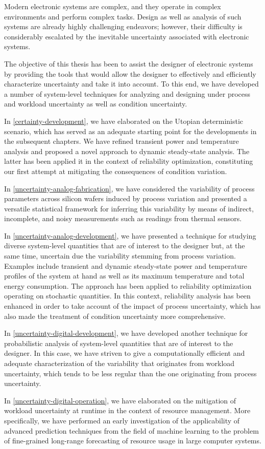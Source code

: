 Modern electronic systems are complex, and they operate in complex environments
and perform complex tasks. Design as well as analysis of such systems are
already highly challenging endeavors; however, their difficulty is considerably
escalated by the inevitable uncertainty associated with electronic systems.

The objective of this thesis has been to assist the designer of electronic
systems by providing the tools that would allow the designer to effectively and
efficiently characterize uncertainty and take it into account. To this end, we
have developed a number of system-level techniques for analyzing and designing
under process and workload uncertainty as well as condition uncertainty.

In \cref{certainty-development}, we have elaborated on the Utopian deterministic
scenario, which has served as an adequate starting point for the developments in
the subsequent chapters. We have refined transient power and temperature
analysis and proposed a novel approach to dynamic steady-state analysis. The
latter has been applied it in the context of reliability optimization,
constituting our first attempt at mitigating the consequences of condition
variation.

In \cref{uncertainty-analog-fabrication}, we have considered the variability of
process parameters across silicon wafers induced by process variation and
presented a versatile statistical framework for inferring this variability by
means of indirect, incomplete, and noisy measurements such as readings from
thermal sensors.

In \cref{uncertainty-analog-development}, we have presented a technique for
studying diverse system-level quantities that are of interest to the designer
but, at the same time, uncertain due the variability stemming from process
variation. Examples include transient and dynamic steady-state power and
temperature profiles of the system at hand as well as its maximum temperature
and total energy consumption. The approach has been applied to reliability
optimization operating on stochastic quantities. In this context, reliability
analysis has been enhanced in order to take account of the impact of process
uncertainty, which has also made the treatment of condition uncertainty more
comprehensive.

In \cref{uncertainty-digital-development}, we have developed another technique
for probabilistic analysis of system-level quantities that are of interest to
the designer. In this case, we have striven to give a computationally efficient
and adequate characterization of the variability that originates from workload
uncertainty, which tends to be less regular than the one originating from
process uncertainty.

In \cref{uncertainty-digital-operation}, we have elaborated on the mitigation of
workload uncertainty at runtime in the context of resource management. More
specifically, we have performed an early investigation of the applicability of
advanced prediction techniques from the field of machine learning to the problem
of fine-grained long-range forecasting of resource usage in large computer
systems.
